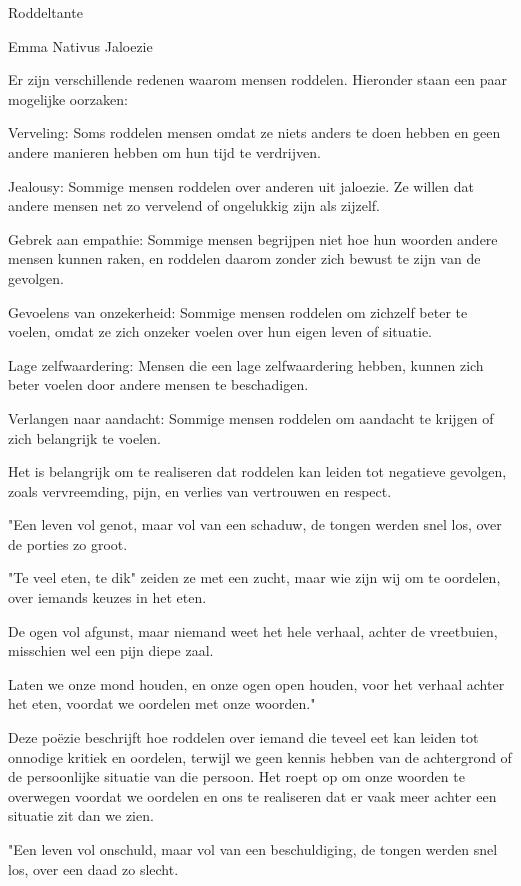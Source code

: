 Roddeltante

Emma Nativus
Jaloezie

Er zijn verschillende redenen waarom mensen roddelen. Hieronder staan een paar mogelijke oorzaken:

Verveling: Soms roddelen mensen omdat ze niets anders te doen hebben en geen andere manieren hebben om hun tijd te verdrijven.

Jealousy: Sommige mensen roddelen over anderen uit jaloezie. Ze willen dat andere mensen net zo vervelend of ongelukkig zijn als zijzelf.

Gebrek aan empathie: Sommige mensen begrijpen niet hoe hun woorden andere mensen kunnen raken, en roddelen daarom zonder zich bewust te zijn van de gevolgen.

Gevoelens van onzekerheid: Sommige mensen roddelen om zichzelf beter te voelen, omdat ze zich onzeker voelen over hun eigen leven of situatie.

Lage zelfwaardering: Mensen die een lage zelfwaardering hebben, kunnen zich beter voelen door andere mensen te beschadigen.

Verlangen naar aandacht: Sommige mensen roddelen om aandacht te krijgen of zich belangrijk te voelen.

Het is belangrijk om te realiseren dat roddelen kan leiden tot negatieve gevolgen, zoals vervreemding, pijn, en verlies van vertrouwen en respect.

"Een leven vol genot,
maar vol van een schaduw,
de tongen werden snel los,
over de porties zo groot.

"Te veel eten, te dik"
zeiden ze met een zucht,
maar wie zijn wij om te oordelen,
over iemands keuzes in het eten.

De ogen vol afgunst,
maar niemand weet het hele verhaal,
achter de vreetbuien,
misschien wel een pijn diepe zaal.

Laten we onze mond houden,
en onze ogen open houden,
voor het verhaal achter het eten,
voordat we oordelen met onze woorden."

Deze poëzie beschrijft hoe roddelen over iemand die teveel eet kan leiden tot onnodige kritiek en oordelen, terwijl we geen kennis hebben van de achtergrond of de persoonlijke situatie van die persoon. Het roept op om onze woorden te overwegen voordat we oordelen en ons te realiseren dat er vaak meer achter een situatie zit dan we zien.

"Een leven vol onschuld,
maar vol van een beschuldiging,
de tongen werden snel los,
over een daad zo slecht.

